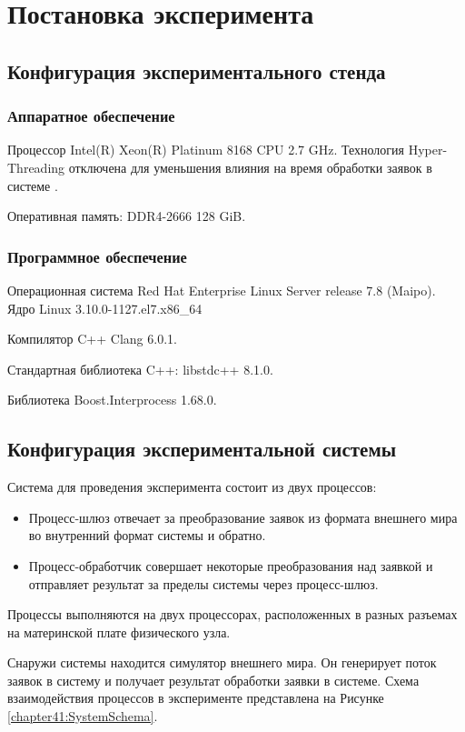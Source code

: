 \section{Постановка эксперимента}

\subsection{Конфигурация экспериментального стенда}

\subsubsection{Аппаратное обеспечение}

Процессор Intel(R) Xeon(R) Platinum 8168 CPU 2.7 GHz.
Технология Hyper-Threading отключена для уменьшения влияния на время обработки заявок в системе \cite{LowLatencyHT}.

Оперативная память: DDR4-2666 128 GiB.

\subsubsection{Программное обеспечение}

Операционная система Red Hat Enterprise Linux Server release 7.8 (Maipo).
Ядро Linux 3.10.0-1127.el7.x86\_64

Компилятор C++ Clang 6.0.1.

Стандартная библиотека C++: libstdc++ 8.1.0.

Библиотека Boost.Interprocess 1.68.0.

\subsection{Конфигурация экспериментальной системы}

Система для проведения эксперимента состоит из двух процессов:
\begin{itemize}
\item Процесс-шлюз отвечает за преобразование заявок из формата внешнего мира во внутренний формат системы и обратно. 
\item Процесс-обработчик совершает некоторые преобразования над заявкой и отправляет результат за пределы системы через процесс-шлюз.
\end{itemize}

Процессы выполняются на двух процессорах, расположенных в разных разъемах на материнской плате физического узла.

Снаружи системы находится симулятор внешнего мира. Он генерирует поток заявок в систему и получает результат обработки заявки в системе. Схема взаимодействия процессов в эксперименте представлена на Рисунке \ref{chapter41:SystemSchema}.


